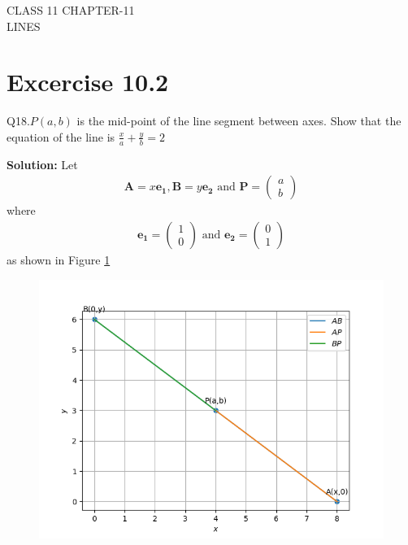 \documentclass[12pt]{article}
\newcommand{\solution}{\noindent \textbf{Solution: }}
\newcommand{\myvec}[1]{\ensuremath{\begin{pmatrix}#1\end{pmatrix}}}
\let\vec\mathbf
\begin{document}
\begin{center}
\textbf\large{CLASS 11 CHAPTER-11 \\ LINES}

\end{center}
\section*{Excercise 10.2}

Q18.$P(a,b)$ is the mid-point of the line segment between axes. Show that the equation of the line is $\frac{x}{a}+\frac{y}{b}=2$

\solution
Let
\begin{align}
	\vec{A}=x\vec{e_{1}}, \vec{B}=y\vec{e_{2}} \text{ and } \vec{P}=\myvec{a\\b}
\end{align}
where
\begin{align}
	\vec{e_{1}}=\myvec{1\\0} \text{ and } \vec{e_{2}}=\myvec{0\\1}
\end{align}
as shown in Figure \ref{fig:Fig1}
\begin{figure}[!h]
	\begin{center} 
	    \includegraphics[width=\columnwidth]{figs/line1}
	\end{center}
\caption{}
\label{fig:Fig1}
\end{figure}
\end{document}
